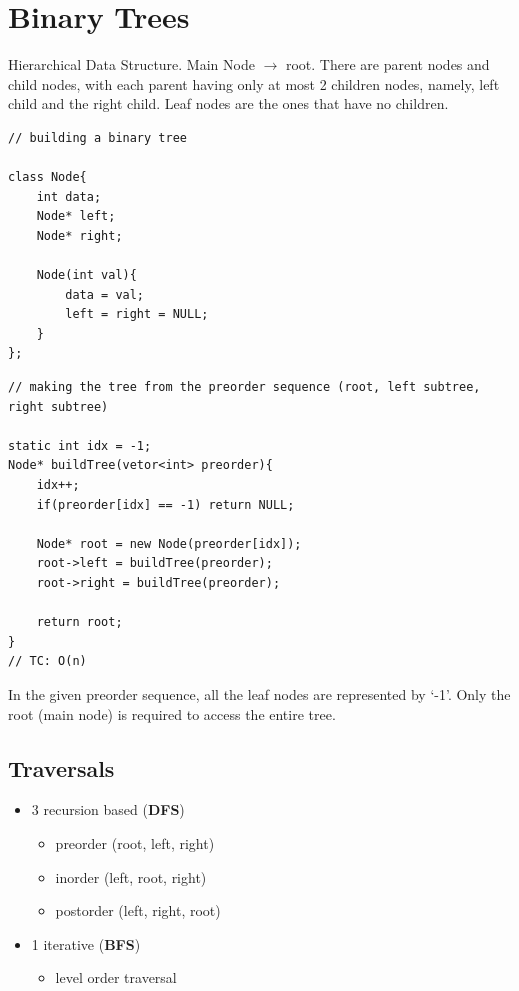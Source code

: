 \documentclass[11pt]{article}
\begin{document}
\section{Binary Trees}

Hierarchical Data Structure. Main Node $\rightarrow$ root. There are parent nodes and child nodes, with each parent having only at most 2 children nodes, namely, left child and the right child. Leaf nodes are the ones that have no children.

\begin{minipage}{\linewidth}
\begin{lstlisting}
// building a binary tree

class Node{
	int data;
	Node* left;
	Node* right;

	Node(int val){
		data = val;
		left = right = NULL;
	}
};
\end{lstlisting}
\end{minipage}

\begin{minipage}{\linewidth}
\begin{lstlisting}
// making the tree from the preorder sequence (root, left subtree, right subtree)

static int idx = -1;
Node* buildTree(vetor<int> preorder){
	idx++;
	if(preorder[idx] == -1) return NULL;

	Node* root = new Node(preorder[idx]);
	root->left = buildTree(preorder);
	root->right = buildTree(preorder);

	return root;
}
// TC: O(n)
\end{lstlisting}
\end{minipage}

In the given preorder sequence, all the leaf nodes are represented by `-1'. Only the root (main node) is required to access the entire tree.

\subsection{Traversals}
\begin{itemize}
    \item 3 recursion based (\textbf{DFS})
    \begin{itemize}
        \item preorder (root, left, right)
        \item inorder (left, root, right)
        \item postorder (left, right, root)
    \end{itemize}
    \item 1 iterative (\textbf{BFS})
    \begin{itemize}
        \item level order traversal
    \end{itemize}
\end{itemize}
\end{document}
